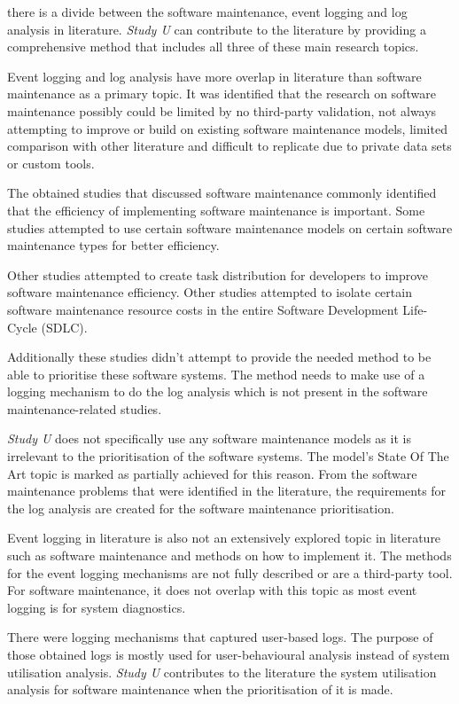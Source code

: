  there is a divide between the software maintenance, event logging and log analysis in literature. \textit{Study U} can contribute to the literature by providing a comprehensive method that includes all three of these main research topics. \par Event logging and log analysis have more overlap in literature than software maintenance as a primary topic. It was identified that the research on software maintenance possibly could be limited by no third-party validation, not always attempting to improve or build on existing software maintenance models, limited comparison with other literature and difficult to replicate due to private data sets or custom tools.\par The obtained studies that discussed software maintenance commonly identified that the efficiency of implementing software maintenance is important. Some studies attempted to use certain software maintenance models on certain software maintenance types for better efficiency. \par Other studies attempted to create task distribution for developers to improve software maintenance efficiency. Other studies attempted to isolate certain software maintenance resource costs in the entire Software Development Life-Cycle (SDLC).\par Additionally these studies didn't attempt to provide the needed method to be able to prioritise these software systems. The method needs to make use of a logging mechanism to do the log analysis which is not present in the software maintenance-related studies.\par \textit{Study U} does not specifically use any software maintenance models as it is irrelevant to the prioritisation of the software systems. The model's State Of The Art topic is marked as partially achieved for this reason. From the software maintenance problems that were identified in the literature, the requirements for the log analysis are created for the software maintenance prioritisation. \par Event logging in literature is also not an extensively explored topic in literature such as software maintenance and methods on how to implement it. The methods for the event logging mechanisms are not fully described or are a third-party tool. For software maintenance, it does not overlap with this topic as most event logging is for system diagnostics.\par There were logging mechanisms that captured user-based logs. The purpose of those obtained logs is mostly used for user-behavioural analysis instead of system utilisation analysis. \textit{Study U} contributes to the literature the system utilisation analysis for software maintenance when the prioritisation of it is made.

